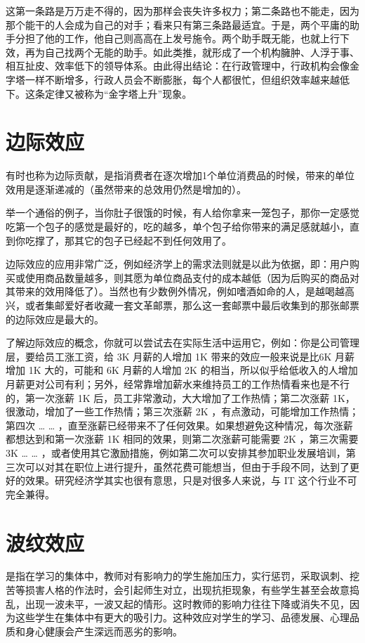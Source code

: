 \documentclass[11pt]{ctexart}
\begin{document}
这第一条路是万万走不得的，因为那样会丧失许多权力；第二条路也不能走，因为那个能干的人会成为自己的对手；看来只有第三条路最适宜。于是，两个平庸的助手分担了他的工作，他自己则高高在上发号施令。两个助手既无能，也就上行下效，再为自己找两个无能的助手。如此类推，就形成了一个机构臃肿、人浮于事、相互扯皮、效率低下的领导体系。由此得出结论：在行政管理中，行政机构会像金字塔一样不断增多，行政人员会不断膨胀，每个人都很忙，但组织效率越来越低下。这条定律又被称为“金字塔上升”现象。
\section{边际效应}
\label{sec-14}


有时也称为边际贡献，是指消费者在逐次增加1个单位消费品的时候，带来的单位效用是逐渐递减的（虽然带来的总效用仍然是增加的）。

举一个通俗的例子，当你肚子很饿的时候，有人给你拿来一笼包子，那你一定感觉吃第一个包子的感觉是最好的，吃的越多，单个包子给你带来的满足感就越小，直到你吃撑了，那其它的包子已经起不到任何效用了。

边际效应的应用非常广泛，例如经济学上的需求法则就是以此为依据，即：用户购买或使用商品数量越多，则其愿为单位商品支付的成本越低（因为后购买的商品对其带来的效用降低了）。当然也有少数例外情况，例如嗜酒如命的人，是越喝越高兴，或者集邮爱好者收藏一套文革邮票，那么这一套邮票中最后收集到的那张邮票的边际效应是最大的。

了解边际效应的概念，你就可以尝试去在实际生活中运用它，例如：你是公司管理层，要给员工涨工资，给 3K 月薪的人增加 1K 带来的效应一般来说是比6K 月薪增加 1K 大的，可能和 6K 月薪的人增加 2K 的相当，所以似乎给低收入的人增加月薪更对公司有利；另外，经常靠增加薪水来维持员工的工作热情看来也是不行的，第一次涨薪 1K 后，员工非常激动，大大增加了工作热情；第二次涨薪 1K，很激动，增加了一些工作热情；第三次涨薪 2K ，有点激动，可能增加工作热情；第四次 \ldots{} \ldots{} ，直至涨薪已经带来不了任何效果。如果想避免这种情况，每次涨薪都想达到和第一次涨薪 1K 相同的效果，则第二次涨薪可能需要 2K ，第三次需要 3K \ldots{} \ldots{} ，或者使用其它激励措施，例如第二次可以安排其参加职业发展培训，第三次可以对其在职位上进行提升，虽然花费可能想当，但由于手段不同，达到了更好的效果。研究经济学其实也很有意思，只是对很多人来说，与 IT 这个行业不可完全兼得。
\section{波纹效应}
\label{sec-15}


是指在学习的集体中，教师对有影响力的学生施加压力，实行惩罚，采取讽刺、挖苦等损害人格的作法时，会引起师生对立，出现抗拒现象，有些学生甚至会故意捣乱，出现一波未平，一波又起的情形。这时教师的影响力往往下降或消失不见，因为这些学生在集体中有更大的吸引力。这种效应对学生的学习、品德发展、心理品质和身心健康会产生深远而恶劣的影响。
\end{document}
